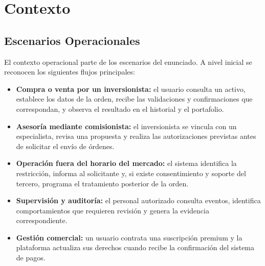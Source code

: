 \documentclass[11pt,a4paper,oneside]{article}
\begin{document}
\endgroup

\section{Contexto}
\subsection{Escenarios Operacionales}
El contexto operacional parte de los escenarios del enunciado. A nivel inicial se reconocen los siguientes flujos principales:
\begin{itemize}
    \item \textbf{Compra o venta por un inversionista:} el usuario consulta un activo, establece los datos de la orden, recibe las validaciones y confirmaciones que correspondan, y observa el resultado en el historial y el portafolio.
    \item \textbf{Asesoría mediante comisionista:} el inversionista se vincula con un especialista, revisa una propuesta y realiza las autorizaciones previstas antes de solicitar el envío de órdenes.
    \item \textbf{Operación fuera del horario del mercado:} el sistema identifica la restricción, informa al solicitante y, si existe consentimiento y soporte del tercero, programa el tratamiento posterior de la orden.
    \item \textbf{Supervisión y auditoría:} el personal autorizado consulta eventos, identifica comportamientos que requieren revisión y genera la evidencia correspondiente.
    \item \textbf{Gestión comercial:} un usuario contrata una suscripción premium y la plataforma actualiza sus derechos cuando recibe la confirmación del sistema de pagos.
\end{itemize}

\begingroup
\footnotesize
\setlength{\tabcolsep}{5pt}
\renewcommand{\arraystretch}{1.20}
\newlength{\anchoOperacional}
\setlength{\anchoOperacional}{\dimexpr\linewidth-8\tabcolsep-5\arrayrulewidth\relax}
\end{document}
